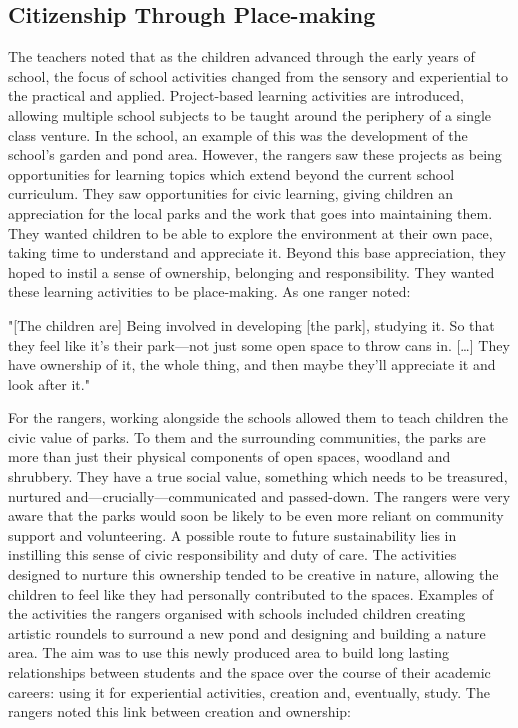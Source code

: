 \subsection{Citizenship Through Place-making}

The teachers noted that as the children advanced through the early years of school, the focus of school activities changed from the sensory and experiential to the practical and applied. Project-based learning activities are introduced, allowing multiple school subjects to be taught around the periphery of a single class venture. In the school, an example of this was the development of the school’s garden and pond area. However, the rangers saw these projects as being opportunities for learning topics which extend beyond the current school curriculum.  They saw opportunities for civic learning, giving children an appreciation for the local parks and the work that goes into maintaining them. They wanted children to be able to explore the environment at their own pace, taking time to understand and appreciate it. Beyond this base appreciation, they hoped to instil a sense of ownership, belonging and responsibility. They wanted these learning activities to be place-making. As one ranger noted:

\begin{displayquote}
"[The children are] Being involved in developing [the park], studying it. So that they feel like it's their park---not just some open space to throw cans in. […] They have ownership of it, the whole thing, and then maybe they’ll appreciate it and look after it."
\end{displayquote}

For the rangers, working alongside the schools allowed them to teach children the civic value of parks. To them and the surrounding communities, the parks are more than just their physical components of open spaces, woodland and shrubbery. They have a true social value, something which needs to be treasured, nurtured and---crucially---communicated and passed-down. The rangers were very aware that the parks would soon be likely to be even more reliant on community support and volunteering. A possible route to future sustainability lies in instilling this sense of civic responsibility and duty of care. The activities designed to nurture this ownership tended to be creative in nature, allowing the children to feel like they had personally contributed to the spaces. Examples of the activities the rangers organised with schools included children creating artistic roundels to surround a new pond and designing and building a nature area. The aim was to use this newly produced area to build long lasting relationships between students and the space over the course of their academic careers: using it for experiential activities, creation and, eventually, study. The rangers noted this link between creation and ownership:

